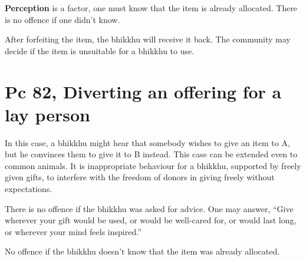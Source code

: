 \textbf{Perception} is a factor, one must know that the item is already
allocated. There is no offence if one didn't know.

After forfeiting the item, the bhikkhu will receive it back. The
community may decide if the item is unsuitable for a bhikkhu to use.

\section{Pc 82, Diverting an offering for a lay person}

In this case, a bhikkhu might hear that somebody wishes to give an item
to A, but he convinces them to give it to B instead. This case can be
extended even to common animals. It is inappropriate behaviour for a
bhikkhu, supported by freely given gifts, to interfere with the freedom
of donors in giving freely without expectations.

There is no offence if the bhikkhu was asked for advice. One may answer,
``Give wherever your gift would be used, or would be well-cared for, or
would last long, or wherever your mind feels inspired.''

No offence if the bhikkhu doesn't know that the item was already
allocated.

